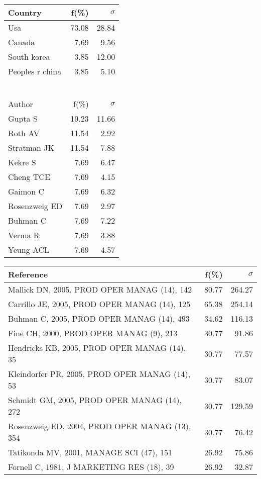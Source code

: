 \documentclass[a4paper,11pt]{report}
\begin{document}
\begin{landscape}
\begin{table}[!ht]
{\begin{tabular}{|l r r|}
\hline
\hline
Country & f(\%) & $\sigma$\\
\hline
Usa & 73.08 & 28.84\\
Canada & 7.69 & 9.56\\
South korea & 3.85 & 12.00\\
Peoples r china & 3.85 & 5.10\\
 &  & \\
 &  & \\
 &  & \\
 &  & \\
 &  & \\
 &  & \\
\hline
\hline
Author & f(\%) & $\sigma$\\
\hline
Gupta S & 19.23 & 11.66\\
Roth AV & 11.54 & 2.92\\
Stratman JK & 11.54 & 7.88\\
Kekre S & 7.69 & 6.47\\
Cheng TCE & 7.69 & 4.15\\
Gaimon C & 7.69 & 6.32\\
Rosenzweig ED & 7.69 & 2.97\\
Buhman C & 7.69 & 7.22\\
Verma R & 7.69 & 3.88\\
Yeung ACL & 7.69 & 4.57\\
\hline
\end{tabular}
}
{\scriptsize\begin{tabular}{|l r r|}
\hline
Reference & f(\%) & $\sigma$\\
\hline
Mallick DN, 2005, PROD OPER MANAG (14), 142 & 80.77 & 264.27\\
Carrillo JE, 2005, PROD OPER MANAG (14), 125 & 65.38 & 254.14\\
Buhman C, 2005, PROD OPER MANAG (14), 493 & 34.62 & 116.13\\
Fine CH, 2000, PROD OPER MANAG (9), 213 & 30.77 & 91.86\\
Hendricks KB, 2005, PROD OPER MANAG (14), 35 & 30.77 & 77.57\\
Kleindorfer PR, 2005, PROD OPER MANAG (14), 53 & 30.77 & 83.07\\
Schmidt GM, 2005, PROD OPER MANAG (14), 272 & 30.77 & 129.59\\
Rosenzweig ED, 2004, PROD OPER MANAG (13), 354 & 30.77 & 76.42\\
Tatikonda MV, 2001, MANAGE SCI (47), 151 & 26.92 & 75.86\\
Fornell C, 1981, J MARKETING RES (18), 39 & 26.92 & 32.87\\

\end{tabular}}
\end{table}
\end{landscape}
\end{document}
